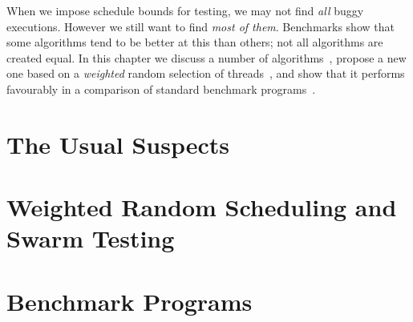 When we impose schedule bounds for testing, we may not find
\emph{all} buggy executions.  However we still want to find \emph{most of them}.
Benchmarks show that some algorithms tend to be better at this than others; not
all algorithms are created equal.  In this chapter we discuss a number of
algorithms~, propose a new one based on a \emph{weighted}
random selection of threads~, and show that it performs
favourably in a comparison of standard benchmark
programs~.

\section{The Usual Suspects}
\label{sec:algorithms-usual}

\blindtext

\section{Weighted Random Scheduling and Swarm Testing}
\label{sec:algorithms-swarm}

\blindtext

\section{Benchmark Programs}
\label{sec:algorithms-sctbench}

\blindtext

